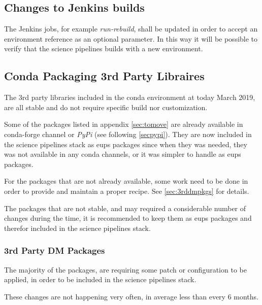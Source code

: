 

\subsection{Changes to Jenkins builds} \label{sec:cibuilds}

The Jenkins jobs, for example \textit{run-rebuild}, shall be updated in order to accept an environment reference as an optional parameter.
In this way it will be possible to verify that the science pipelines builds with a new environment.


\subsection{Conda Packaging 3rd Party Libraires} \label{sec:3rdpkgs}

The 3rd party libraries included in the conda environment at today March 2019, are all stable and do not require specific build nor customization.

Some of the packages listed in appendix \ref{sec:tomove} are already available in conda-forge channel or \textit{PyPi} (see following \ref{secpypi}).
They are now included in the science pipelines stack as eups packages since when they was needed, they was not available in any conda channels, or it was simpler to handle as eups packages.

For the packages that are not already available, some work need to be done in order to provide and maintain a proper recipe. See \ref{sec:3rddmpkgs} for details.

The packages that are not stable, and may required a considerable number of changes during the time, it is recommended to keep them as eups packages and therefor included in the science pipelines stack.


\subsubsection{3rd Party DM Packages}

The majority of the packages, are requiring some patch or configuration to be applied, in order to be included in the science pipelines stack.

These changes are not happening very often, in average less than every 6 months.

